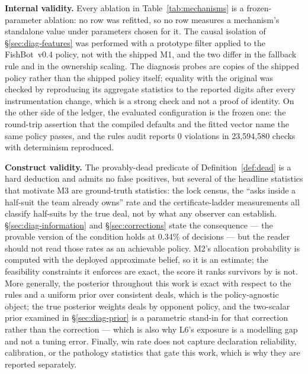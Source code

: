 \documentclass[11pt]{article}
\theoremstyle{definition}
\DeclareRobustCommand{\vfour}{\texorpdfstring{\mbox{FishBot v0.4}}{FishBot v0.4}}
\providecommand{\numProvableOwn}{0.34}
\providecommand{\numVerifyViolations}{0}
\providecommand{\numVerifyChecks}{23{,}594{,}580}
\begin{document}
\textbf{Internal validity.} Every ablation in Table~\ref{tab:mechanisms} is a
frozen-parameter ablation: no row was refitted, so no row measures a mechanism's
standalone value under parameters chosen for it. The causal isolation of
\S\ref{sec:diag-features} was performed with a prototype filter applied to the
\vfour{} policy, not with the shipped M1, and the two differ in the fallback rule
and in the ownership scaling. The diagnosis probes are copies of the shipped
policy rather than the shipped policy itself; equality with the original was
checked by reproducing its aggregate statistics to the reported digits after
every instrumentation change, which is a strong check and not a proof of
identity. On the other side of the ledger, the evaluated configuration is the
frozen one: the round-trip assertion that the compiled defaults and the fitted
vector name the same policy passes, and the rules audit reports
\numVerifyViolations{} violations in \numVerifyChecks{} checks with determinism
reproduced.

\textbf{Construct validity.} The provably-dead predicate of
Definition~\ref{def:dead} is a hard deduction and admits no false positives, but
several of the headline statistics that motivate M3 are ground-truth statistics:
the lock census, the ``asks inside a half-suit the team already owns'' rate and
the certificate-ladder measurements all classify half-suits by the true deal, not
by what any observer can establish. \S\ref{sec:diag-information} and
\S\ref{sec:corrections} state the consequence --- the provable version of the
condition holds at \numProvableOwn\% of decisions --- but the reader should not
read those rates as an achievable policy. M2's allocation probability is computed
with the deployed approximate belief, so it is an estimate; the feasibility
constraints it enforces are exact, the score it ranks survivors by is not.
More generally, the posterior throughout this work is exact with respect to the
rules and a uniform prior over consistent deals, which is the policy-agnostic
object; the true posterior weights deals by opponent policy, and the two-scalar
prior examined in \S\ref{sec:diag-prior} is a parametric stand-in for that
correction rather than the correction --- which is also why L6's exposure is a
modelling gap and not a tuning error. Finally, win rate does not capture
declaration reliability, calibration, or the pathology statistics that gate this
work, which is why they are reported separately.
\end{document}
